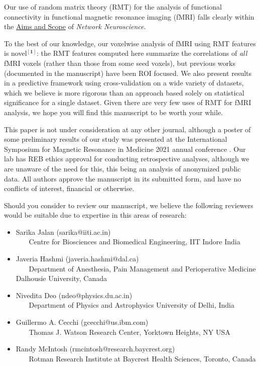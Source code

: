 \documentclass{article}
\begin{document}
Our use of random matrix theory (RMT) for the analysis of functional
connectivity in functional magnetic resonance imaging (fMRI) falls clearly within the
\href{https://direct.mit.edu/netn/pages/submission-guidelines#aims}{Aims and Scope} of \emph{Network
Neuroscience}.


To the best of our knowledge, our voxelwise analysis of fMRI using RMT features is novel\(\mathbf{^{[1]}}\): the RMT
features computed here summarize the correlations of \emph{all} fMRI voxels (rather than those from
some seed voxels), but previous works (documented in the manuscript) have been ROI focused. We also
present results in a predictive framework using cross-validation on a wide variety of datasets,
which we believe is more rigorous than an approach based solely on statistical significance for a
single dataset. Given there are very few uses of RMT for fMRI analysis, we hope you will find this
manuscript to be worth your while.

This paper is not under consideration at any other journal, although a poster of some preliminary
results of our study was presented at the International Symposium for Magnetic Resonance in Medicine
2021 annual conference \citep{bergerOpenSourceRandom2021}. Our lab has REB ethics approval for
conducting retrospective analyses, although we are unaware of the need for this, this being an
analysis of anonymized public data. All authors approve the manuscript in its submitted form, and
have no conflicts of interest, financial or otherwise.

Should you consider to review our manuscript, we believe the following reviewers would be suitable
due to expertise in this areas of research:


\begin{itemize}
\item Sarika Jalan (sarika@iiti.ac.in) \\
\small
~~~ Centre for Biosciences and Biomedical Engineering, IIT Indore India
\normalsize
\item Javeria Hashmi (javeria.hashmi@dal.ca) \\
\small
~~~ Department of Anesthesia, Pain Management and Perioperative Medicine Dalhousie University, Canada
\normalsize
\item Nivedita Deo (ndeo@physics.du.ac.in) \\
\small
~~~ Department of Physics and Astrophysics University of Delhi, India
\normalsize
\item Guillermo A. Cecchi (gcecchi@us.ibm.com) \\
\small
~~~ Thomas J. Watson Research Center, Yorktown Heights, NY USA
\normalsize
\item Randy McIntosh (rmcintosh@research.baycrest.org) \\
\small
~~~ Rotman Research Institute at Baycrest Health Sciences, Toronto, Canada
\normalsize
\end{itemize}
\end{document}
